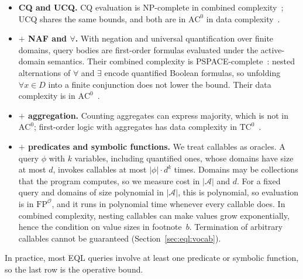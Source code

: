 \documentclass[11pt, a4paper]{article}
\theoremstyle{plain}
\theoremstyle{definition}
\theoremstyle{remark}
\begin{document}
\begin{itemize}
  \item \textbf{CQ and UCQ.}  CQ evaluation is NP-complete in combined
        complexity~\cite{chandra1977optimal}; UCQ shares the same bounds, and both are in
        $\mathrm{AC}^0$ in data complexity~\cite{abiteboul1995foundations}.

  \item \textbf{$+$ NAF and $\forall$.}  With negation and universal quantification over
        finite domains, query bodies are first-order formulas evaluated under the
        active-domain semantics.  Their combined complexity is
        PSPACE-complete~\cite{vardi1982complexity}: nested alternations of $\forall$ and
        $\exists$ encode quantified Boolean formulas, so unfolding $\forall x\in D$ into a
        finite conjunction does not lower the bound.  Their data complexity is in
        $\mathrm{AC}^0$~\cite{immerman1987languages,barrington1990uniformity}.

  \item \textbf{$+$ aggregation.}  Counting aggregates can express majority, which is not in
        $\mathrm{AC}^0$; first-order logic with aggregates has data complexity in
        $\mathrm{TC}^0$~\cite{hella2001aggregate,libkin2003expressive}.

  \item \textbf{$+$ predicates and symbolic functions.}  We treat callables as oracles.  A
        query $\phi$ with $k$ variables, including quantified ones, whose domains have size at
        most $d$, invokes callables at most $|\phi|\cdot d^{k}$ times.  Domains may be collections
        that the program computes, so we measure cost in $|\mathcal{A}|$ and $d$.  For a fixed
        query and domains of size polynomial in $|\mathcal{A}|$, this is polynomial, so
        evaluation is in $\mathrm{FP}^{\mathcal{O}}$, and it runs in polynomial time whenever
        every callable does.  In combined complexity, nesting callables can make values grow
        exponentially, hence the condition on value sizes in footnote~$b$.  Termination of arbitrary callables cannot be guaranteed
        (Section~\ref{sec:eql:vocab}).
\end{itemize}

\noindent In practice, most EQL queries involve at least one predicate or symbolic function,
so the last row is the operative bound.

\clearpage
\end{document}
